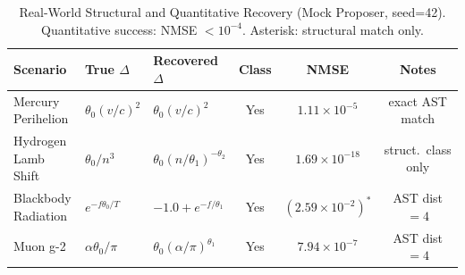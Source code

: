 \begin{table}[t]
\centering\footnotesize
\caption{Real-World Structural and Quantitative Recovery (Mock Proposer, seed=42). Quantitative success: NMSE $< 10^{-4}$. Asterisk: structural match only.}
\label{tab:real_param_recovery}
\begin{tabularx}{\textwidth}{L L L c c c}
\toprule
\textbf{Scenario} & \textbf{True $\Delta$} & \textbf{Recovered $\Delta$} & \textbf{Class} & \textbf{NMSE} & \textbf{Notes} \\
\midrule
Mercury Perihelion & $\theta_{0} (v/c)^2$ & $\theta_{0} (v/c)^2$ & Yes & $1.11 \times 10^{-5}$ & exact AST match \\
Hydrogen Lamb Shift & $\theta_{0}/n^{3}$ & $\theta_{0} (n/\theta_{1})^{-\theta_{2}}$ & Yes & $1.69 \times 10^{-18}$ & struct.\ class only \\
Blackbody Radiation & $e^{-f \theta_{0}/T}$ & $-1.0 + e^{-f/\theta_{1}}$ & Yes & $(2.59 \times 10^{-2})^{\ast}$ & AST dist $=4$ \\
Muon g-2 & $\alpha \theta_{0}/\pi$ & $\theta_{0} (\alpha/\pi)^{\theta_{1}}$ & Yes & $7.94 \times 10^{-7}$ & AST dist $=4$ \\
\bottomrule
\end{tabularx}
\end{table}
